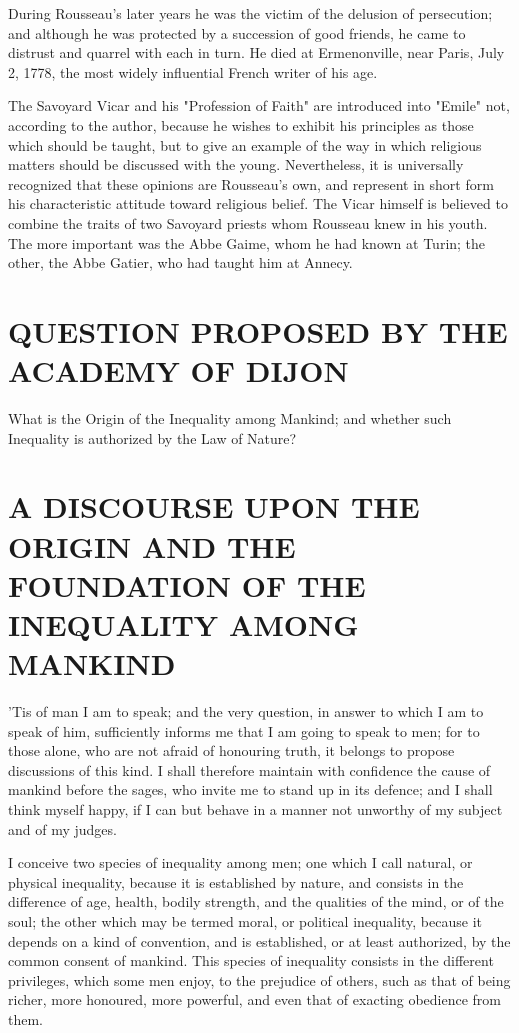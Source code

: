 \documentclass[11pt,twocolumn]{ltugboat}
\begin{document}
During Rousseau's later years he was the victim of the delusion of
persecution; and although he was protected by a succession of good
friends, he came to distrust and quarrel with each in turn. He died at
Ermenonville, near Paris, July 2, 1778, the most widely influential
French writer of his age.

The Savoyard Vicar and his "Profession of Faith" are introduced into
"Emile" not, according to the author, because he wishes to exhibit his
principles as those which should be taught, but to give an example of
the way in which religious matters should be discussed with the young.
Nevertheless, it is universally recognized that these opinions are
Rousseau's own, and represent in short form his characteristic
attitude toward religious belief. The Vicar himself is believed to
combine the traits of two Savoyard priests whom Rousseau knew in his
youth. The more important was the Abbe Gaime, whom he had known at
Turin; the other, the Abbe Gatier, who had taught him at Annecy.




\section*{QUESTION PROPOSED BY THE ACADEMY OF DIJON}

What is the Origin of the Inequality among Mankind; and whether such
Inequality is authorized by the Law of Nature?



\section*{A DISCOURSE UPON THE ORIGIN AND THE FOUNDATION OF THE INEQUALITY AMONG
MANKIND}

'Tis of man I am to speak; and the very question, in answer to which I
am to speak of him, sufficiently informs me that I am going to speak
to men; for to those alone, who are not afraid of honouring truth, it
belongs to propose discussions of this kind. I shall therefore
maintain with confidence the cause of mankind before the sages, who
invite me to stand up in its defence; and I shall think myself happy,
if I can but behave in a manner not unworthy of my subject and of my
judges.

I conceive two species of inequality among men; one which I call
natural, or physical inequality, because it is established by nature,
and consists in the difference of age, health, bodily strength, and
the qualities of the mind, or of the soul; the other which may be
termed moral, or political inequality, because it depends on a kind of
convention, and is established, or at least authorized, by the common
consent of mankind. This species of inequality consists in the
different privileges, which some men enjoy, to the prejudice of
others, such as that of being richer, more honoured, more powerful,
and even that of exacting obedience from them.
\end{document}
